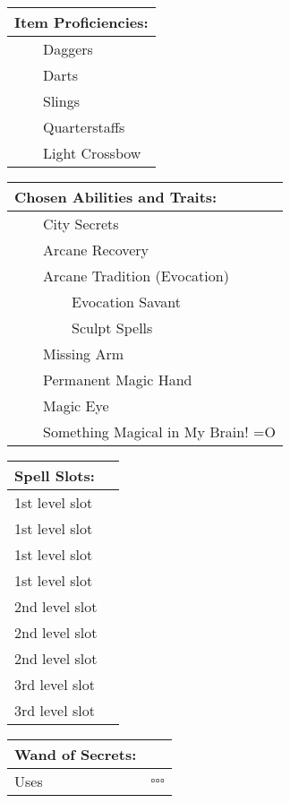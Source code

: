 \documentclass[11pt]{article}
\newcommand{\done}{\rlap{$\square$}{\raisebox{2pt}{\large\hspace{1pt}\ding{51}}}}
\newcommand{\available}{$\square$}
\newcommand{\tabitem}{~~\llap{--}~~}
\newcommand{\tabtabitem}{~~~~~~\llap{$\bullet$}~~}
\begin{document}
\begin{multicols}{2}
\vspace{4mm}

\noindent \begin{tabularx}{95mm}{@{}l}
{\Large \textbf{Item Proficiencies:}} \\
\hline
\tabitem Daggers \\
\tabitem Darts \\
\tabitem Slings \\
\tabitem Quarterstaffs \\
\tabitem Light Crossbow
\end{tabularx}

\vspace{4mm}

\noindent \begin{tabularx}{95mm}{@{}l}
{\Large \textbf{Chosen Abilities and Traits:}} \\
\hline
\tabitem City Secrets \\
\tabitem Arcane Recovery \\
\tabitem Arcane Tradition (Evocation) \\
\tabtabitem Evocation Savant \\
\tabtabitem Sculpt Spells \\
\tabitem Missing Arm \\
\tabitem Permanent Magic Hand \\
\tabitem Magic Eye \\
\tabitem Something Magical in My Brain! =O
		\end{tabularx}

\vspace{4mm}

\noindent \begin{tabularx}{95mm}{@{}l c}
{\Large \textbf{Spell Slots:}} & \\
\hline
1st level slot & \done \\
1st level slot & \done \\
1st level slot & \done \\
1st level slot & \done \\
2nd level slot & \done \\
2nd level slot & \done \\
2nd level slot & \done \\
3rd level slot & \done \\
3rd level slot & \done
		\end{tabularx}

\vspace{4mm}

\noindent \begin{tabularx}{95mm}{@{}l c}
{\Large \textbf{Wand of Secrets:}} & \\
\hline
Uses & \available \available \available
		\end{tabularx}


\end{multicols}
\end{document}
